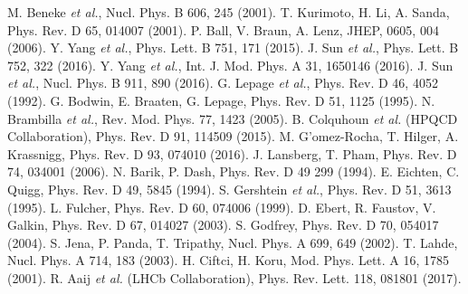 \documentclass[preprint,superscriptaddress,nofootinbib]{revtex4}
\begin{document}
\begin{thebibliography}{99}
          M. Beneke {\em et al.}, Nucl. Phys. B 606, 245 (2001).
          T. Kurimoto, H. Li, A. Sanda, Phys. Rev. D 65, 014007 (2001).
          P. Ball, V. Braun, A. Lenz, JHEP, 0605, 004 (2006).
          Y. Yang {\em et al.}, Phys. Lett. B 751, 171 (2015).
          J. Sun {\em et al.}, Phys. Lett. B 752, 322 (2016).
          Y. Yang {\em et al.}, Int. J. Mod. Phys. A 31, 1650146 (2016).
          J. Sun {\em et al.}, Nucl. Phys. B 911, 890 (2016).
          G. Lepage {\em et al.}, Phys. Rev. D 46, 4052 (1992).
          G. Bodwin, E. Braaten, G. Lepage, Phys. Rev. D 51, 1125 (1995).
          N. Brambilla {\em et al.}, Rev. Mod. Phys. 77, 1423 (2005).
          B. Colquhoun {\em et al.} (HPQCD Collaboration), Phys. Rev. D 91, 114509 (2015).
          M. G\a'{o}mez-Rocha, T. Hilger, A. Krassnigg, Phys. Rev. D 93, 074010 (2016).
          J. Lansberg, T. Pham, Phys. Rev. D 74, 034001 (2006).
          N. Barik, P. Dash, Phys. Rev. D 49 299 (1994).
          E. Eichten, C. Quigg, Phys. Rev. D 49, 5845 (1994).
          S. Gershtein {\em et al.}, Phys. Rev. D 51, 3613 (1995).
          L. Fulcher, Phys. Rev. D 60, 074006 (1999).
          D. Ebert, R. Faustov, V. Galkin, Phys. Rev. D 67, 014027 (2003).
          S. Godfrey, Phys. Rev. D 70, 054017 (2004).
          S. Jena, P. Panda, T. Tripathy, Nucl. Phys. A 699, 649 (2002).
          T. Lahde, Nucl. Phys. A 714, 183 (2003).
          H. Ciftci, H. Koru, Mod. Phys. Lett. A 16, 1785 (2001).
          R. Aaij {\em et al.} (LHCb Collaboration),
          Phys. Rev. Lett. 118, 081801 (2017). %
  \end{thebibliography}
  
\end{document}
